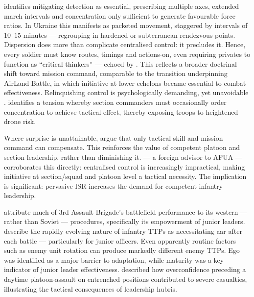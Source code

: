 \textcite[61,196]{fm30} identifies mitigating detection as essential, prescribing multiple axes, extended march intervals and concentration only sufficient to generate favourable force ratios. In Ukraine this manifests as packeted movement, staggered by intervals of $10$--$15$ minutes --- regrouping in hardened or subterranean rendezvous points. Dispersion does more than complicate centralised control: it precludes it. Hence, every soldier must know routes, timings and actions-on, even requiring privates to function as ``critical thinkers'' \parencite[1:04:00--1:32:00]{murray_tuga} --- echoed by \textcite{Leach_curtain,dan_participant_1}. This reflects a broader doctrinal shift toward mission command, comparable to the transition underpinning AirLand Battle, in which initiative at lower echelons became essential to combat effectiveness.  Relinquishing control is psychologically demanding, yet unavoidable \parencite{darragh_participant_4}. \textcite{fred_participant_9} identifies a tension whereby section commanders must occasionally order concentration to achieve tactical effect, thereby exposing troops to heightened drone risk.


Where surprise is unattainable, \textcite{neron_bancel_2024_05_27} argue that only tactical skill and mission command can compensate. This reinforces the value of competent platoon and section leadership, rather than diminishing it. \textcite{TCAG_Brad} --- a foreign advisor to AFUA --- corroborates this directly: centralised control is increasingly impractical, making initiative at section/squad and platoon level a tactical necessity. The implication is significant: pervasive ISR increases the demand for competent infantry leadership.

\textcite[5:20--6:26]{murray_tuga} attribute much of 3rd Assault Brigade's battlefield performance to its western --- rather than Soviet --- procedures, specifically its empowerment of junior leaders. \textcite[1:04:52--1:32:00]{murray_tuga} describe the rapidly evolving nature of infantry TTPs as necessitating \gls{aar} after each battle --- particularly for junior officers. Even apparently routine factors such as enemy unit rotation can produce markedly different enemy TTPs. Ego was identified as a major barrier to adaptation, while maturity was a key indicator of junior leader effectiveness. \textcite{darragh_participant_4} described how overconfidence preceding a daytime platoon-assault on entrenched positions contributed to severe casualties, illustrating the tactical consequences of leadership hubris.

